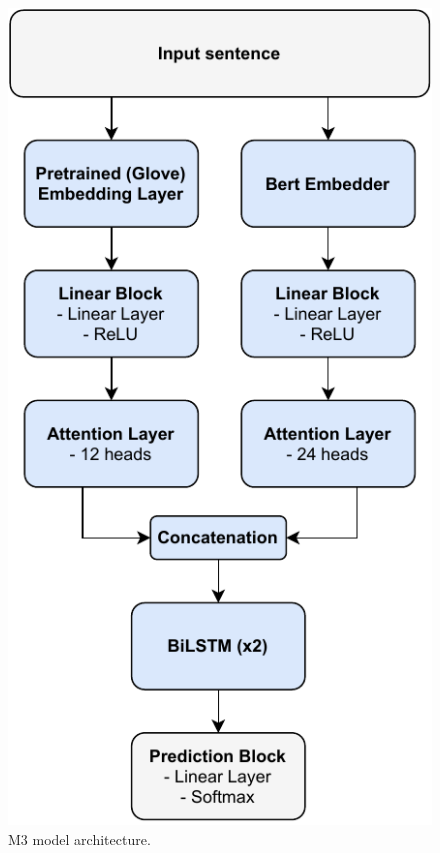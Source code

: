\documentclass[11pt,a4paper]{article}
\begin{document}
	\begin{figure}[H]
		\centering
		\includegraphics[width=1\columnwidth]{M3_diagram.pdf}
		\caption{M3 model architecture.}
		\label{fig:M3_architecture}
	\end{figure}
	
\end{document}
